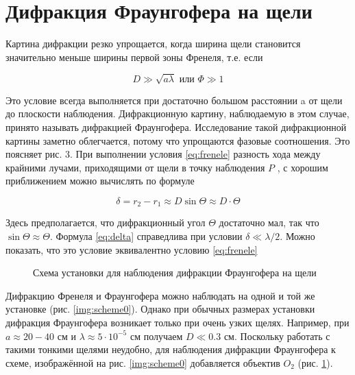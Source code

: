 \documentclass[a5paper,10pt, twoside]{article} %
\begin{document}
\section{Дифракция Фраунгофера на щели}

	Картина дифракции резко упрощается, когда ширина щели становится значительно меньше ширины первой
	зоны Френеля, т.е. если

	\begin{equation}
		D \gg \sqrt{a \lambda} \text{ или } \Phi \gg 1
	\end{equation}\label{eq:frenele}

	Это условие всегда выполняется при достаточно большом расстоянии a от щели до плоскости наблюдения.
	Дифракционную картину, наблюдаемую в этом случае, принято называть дифракцией Фраунгофера.
	Исследование такой дифракционной картины заметно облегчается, потому что упрощаются фазовые
	соотношения. Это поясняет рис. 3. При выполнении условия \eqref{eq:frenele} разность хода между
	крайними лучами, приходящими от щели в точку наблюдения $P$ , с хорошим приближением можно
	вычислять по формуле

	\begin{equation}
		\delta = r_2 - r_1 \approx D \sin \Theta \approx D \cdot \Theta
	\end{equation}\label{eq:delta}

	Здесь предполагается, что дифракционный угол $\Theta$ достаточно мал, так что 
	$\sin \Theta \approx \Theta$. Формула \eqref{eq:delta} справедлива при условии $\delta \ll \lambda / 2$.
	Можно показать, что это условие эквивалентно условию \eqref{eq:frenele}

	\begin{figure}[h]
		\caption{Схема установки для наблюдения дифракции Фраунгофера на щели}
		\label{img:scheme1}
	\end{figure}


	Дифракцию Френеля и Фраунгофера можно наблюдать на одной и той же установке (рис. \ref{img:scheme0}).
	Однако при обычных размерах установки дифракция Фраунгофера возникает только при очень узких щелях.
	Например, при $a \approx 20-40$ см и $\lambda \approx 5 \cdot 10^{-5}$ см получаем $D \ll 0.3$ см.
	Поскольку работать с такими тонкими щелями неудобно, для наблюдения дифракции Фраунгофера к схеме,
	изображённой на рис. \ref{img:scheme0} добавляется объектив $O_2$ (рис. \ref{img:scheme1}).
\end{document}
